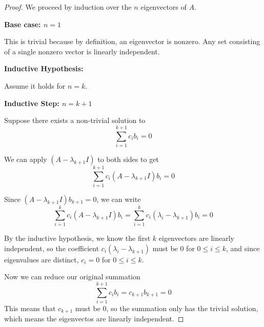 \begin{proof}
We proceed by induction over the $n$ eigenvectors of $A$. 

\textbf{Base case: $n = 1$}

This is trivial because by definition, an eigenvector is nonzero. Any set consisting of a single nonzero vector is linearly independent.

\textbf{Inductive Hypothesis:}

Assume it holds for $n = k$. 

\textbf{Inductive Step: $n = k + 1$}

Suppose there exists a non-trivial solution to 
$$ \sum_{i = 1}^{k + 1} c_{i} b_{i} = 0$$

We can apply $(A - \lambda_{k + 1} I)$ to both sides to get 
$$ \sum_{i = 1}^{k + 1} c_{i} (A - \lambda_{k + 1} I) b_{i} = 0$$

Since $(A - \lambda_{k + 1}I) b_{k + 1} = 0$, we can write 
$$\sum_{i = 1}^{k} c_{i} (A - \lambda_{k + 1} I ) b_{i} = \sum_{i = 1}^{k} c_{i} (\lambda_{i} - \lambda_{k + 1} ) b_{i} = 0$$ 

By the inductive hypothesis, we know the first $k$ eigenvectors are linearly independent, so the coefficient $c_{i} (\lambda_{i} - \lambda_{k + 1} )$ must be 0 for $0 \leq i \leq k$, and since eigenvalues are distinct, $c_{i} = 0$ for $0 \leq i \leq k$. 

Now we can reduce our original summation 
$$\sum_{i = 1}^{k+1} c_{i} b_{i} = c_{k+1} b_{k+1} = 0$$
This means that $c_{k+1}$ must be 0, so the summation only has the trivial solution, which means the eigenvectos are linearly independent. 
\end{proof}